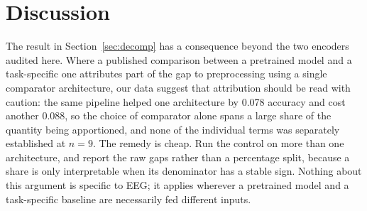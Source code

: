 \section{Discussion}

%
%
%



The result in Section~\ref{sec:decomp} has a consequence beyond the two
encoders audited here. Where a published comparison between a pretrained model
and a task-specific one attributes part of the gap to preprocessing using a
single comparator architecture, our data suggest that attribution should be
read with caution: the same pipeline helped one architecture by 0.078 accuracy
and cost another 0.088, so the choice of comparator alone spans a large share
of the quantity being apportioned, and none of the individual terms was
separately established at $n=9$. The remedy is cheap. Run the
control on more than one architecture, and report the raw gaps rather than a
percentage split, because a share is only interpretable when its denominator
has a stable sign. Nothing about this argument is specific to EEG; it applies
wherever a pretrained model and a task-specific baseline are necessarily fed
different inputs.

